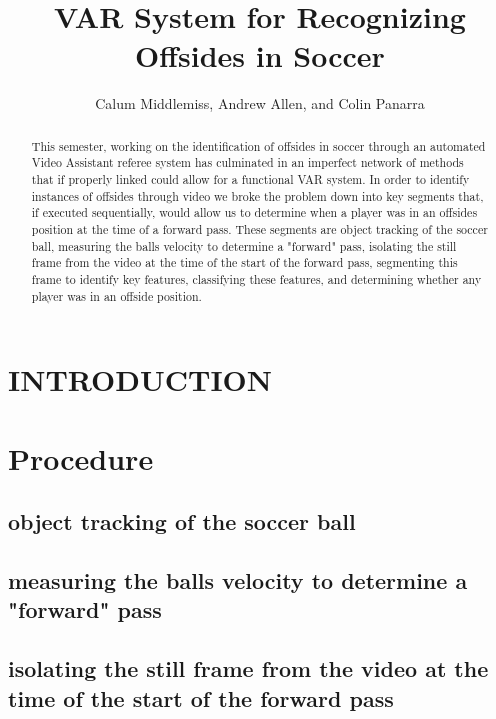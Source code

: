 \documentclass[letterpaper, 10 pt, conference]{ieeeconf}  %
\title{\LARGE \bf
VAR System for Recognizing Offsides in Soccer
}
\author{Calum Middlemiss, Andrew Allen, and Colin Panarra%
}
\begin{document}
\maketitle
\thispagestyle{empty}
\pagestyle{empty}


\begin{abstract}

This semester, working on the identification of offsides in soccer through an automated Video Assistant referee system has culminated in an imperfect network of methods that if properly linked could allow for a functional VAR system. In order to identify instances of offsides through video we broke the problem down into key segments that, if executed sequentially, would allow us to determine when a player was in an offsides position at the time of a forward pass. These segments are object tracking of the soccer ball, measuring the balls velocity to determine a "forward" pass, isolating the still frame from the video at the time of the start of the forward pass, segmenting this frame to identify key features, classifying these features, and determining whether any player was in an offside position. 

\end{abstract}


\section{INTRODUCTION}



\section{Procedure}

\subsection{object tracking of the soccer ball}

\subsection{measuring the balls velocity to determine a "forward" pass}

\subsection{isolating the still frame from the video at the time of the start of the forward pass}
\end{document}
